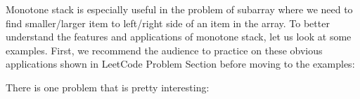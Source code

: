 \documentclass[../main.tex]{subfiles}
\begin{document}
Monotone stack is especially useful in the problem of subarray where we need to find smaller/larger item to left/right side of an item in the array. To better understand the features and applications of monotone stack, let us look at some examples. First, we recommend the audience to practice on these obvious applications shown in LeetCode Problem Section before moving to the examples:

There is one problem that is pretty interesting:
\end{document}
